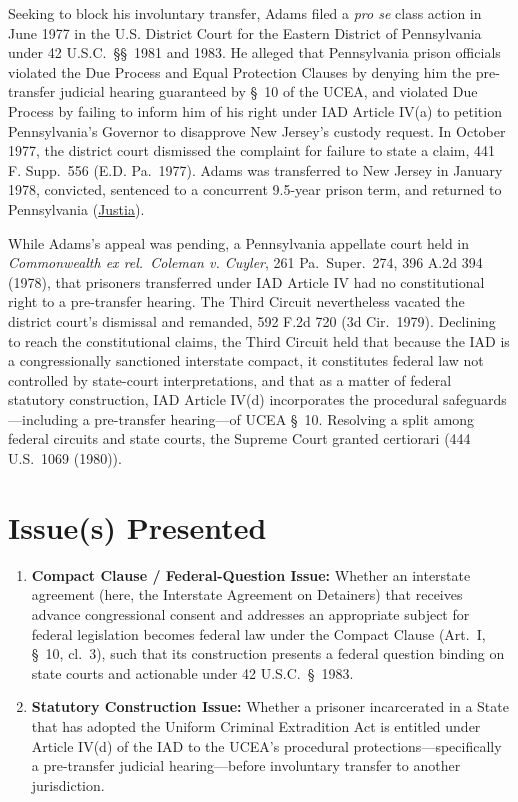 \documentclass[12pt]{article}
\begin{document}
Seeking to block his involuntary transfer, Adams filed a \textit{pro se} class action in June 1977 in the U.S. District Court for the Eastern District of Pennsylvania under 42 U.S.C.\ \S\S\ 1981 and 1983. He alleged that Pennsylvania prison officials violated the Due Process and Equal Protection Clauses by denying him the pre-transfer judicial hearing guaranteed by \S\ 10 of the UCEA, and violated Due Process by failing to inform him of his right under IAD Article IV(a) to petition Pennsylvania's Governor to disapprove New Jersey's custody request. In October 1977, the district court dismissed the complaint for failure to state a claim, 441 F. Supp.\ 556 (E.D. Pa.\ 1977). Adams was transferred to New Jersey in January 1978, convicted, sentenced to a concurrent 9.5-year prison term, and returned to Pennsylvania (\href{https://supreme.justia.com/cases/federal/us/449/433/}{Justia}).

While Adams's appeal was pending, a Pennsylvania appellate court held in \textit{Commonwealth ex rel.\ Coleman v. Cuyler}, 261 Pa.\ Super.\ 274, 396 A.2d 394 (1978), that prisoners transferred under IAD Article IV had no constitutional right to a pre-transfer hearing. The Third Circuit nevertheless vacated the district court's dismissal and remanded, 592 F.2d 720 (3d Cir.\ 1979). Declining to reach the constitutional claims, the Third Circuit held that because the IAD is a congressionally sanctioned interstate compact, it constitutes federal law not controlled by state-court interpretations, and that as a matter of federal statutory construction, IAD Article IV(d) incorporates the procedural safeguards---including a pre-transfer hearing---of UCEA \S\ 10. Resolving a split among federal circuits and state courts, the Supreme Court granted certiorari (444 U.S.\ 1069 (1980)).

\section{Issue(s) Presented}

\begin{enumerate}
  \item \textbf{Compact Clause / Federal-Question Issue:} Whether an interstate agreement (here, the Interstate Agreement on Detainers) that receives advance congressional consent and addresses an appropriate subject for federal legislation becomes federal law under the Compact Clause (Art.\ I, \S\ 10, cl.\ 3), such that its construction presents a federal question binding on state courts and actionable under 42 U.S.C.\ \S\ 1983.
  \item \textbf{Statutory Construction Issue:} Whether a prisoner incarcerated in a State that has adopted the Uniform Criminal Extradition Act is entitled under Article IV(d) of the IAD to the UCEA's procedural protections---specifically a pre-transfer judicial hearing---before involuntary transfer to another jurisdiction.
\end{enumerate}
\end{document}
